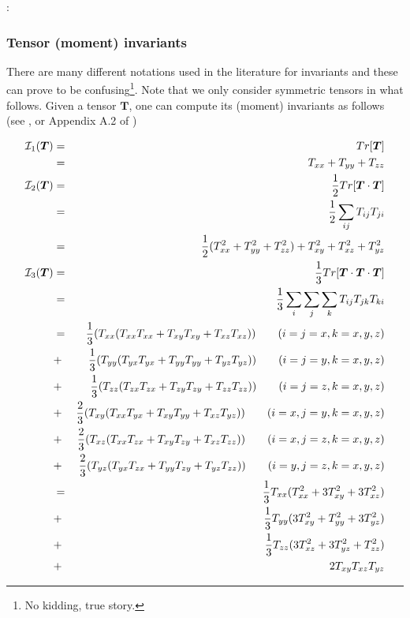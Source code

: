 
\Literature: \cite{mumc03,chpe15,momu06,muso11}

\subsubsection{Tensor (moment) invariants}\label{sec:invariants}


There are many different notations used in the literature for invariants 
and these can prove to be 
confusing\footnote{No kidding, true story.}. Note that we only consider symmetric tensors in what follows.
Given a tensor $\bm{T}$,  one can compute its (moment) invariants as follows 
(see \cite[p.339]{reddybook2}, or Appendix A.2 of \cite{zita2})

\begin{eqnarray}
{\cal I}_1({\bm T}) 
&=& Tr[\bm{T}] \\
&=& T_{xx} + T_{yy} + T_{zz} \\ 
{\cal I}_2({\bm T}) 
&=& \frac{1}{2} Tr[{\bm T}\cdot{\bm T}] \\
&=& \frac{1}{2} \sum_{ij} T_{ij} T_{ji} \\
&=& \frac{1}{2} (T_{xx}^2 + T_{yy}^2 + T_{zz}^2) + T_{xy}^2 + T_{xz}^2 + T_{yz}^2 \\ 
{\cal I}_3({\bm T}) 
&=& \frac{1}{3} Tr[{\bm T}\cdot{\bm T}\cdot {\bm T}]   \\
&=& \frac{1}{3}\sum_i\sum_j \sum_k T_{ij} T_{jk} T_{ki}  \\
&=& \frac{1}{3} (T_{xx} ( T_{xx}T_{xx} + T_{xy}T_{xy} + T_{xz}T_{xz} )) \qquad (i=j=x,k=x,y,z)\nonumber\\ 
&+& \frac{1}{3} (T_{yy} ( T_{yx}T_{yx} + T_{yy}T_{yy} + T_{yz}T_{yz} )) \qquad (i=j=y,k=x,y,z)\nonumber\\ 
&+& \frac{1}{3} (T_{zz} ( T_{zx}T_{zx} + T_{zy}T_{zy} + T_{zz}T_{zz} )) \qquad (i=j=z,k=x,y,z)\nonumber\\ 
&+& \frac{2}{3} (T_{xy} ( T_{xx}T_{yx} + T_{xy}T_{yy} + T_{xz}T_{yz} )) \qquad (i=x,j=y,k=x,y,z)\nonumber\\ 
&+& \frac{2}{3} (T_{xz} ( T_{xx}T_{zx} + T_{xy}T_{zy} + T_{xz}T_{zz} )) \qquad (i=x,j=z,k=x,y,z)\nonumber\\ 
&+& \frac{2}{3} (T_{yz} ( T_{yx}T_{zx} + T_{yy}T_{zy} + T_{yz}T_{zz} )) \qquad (i=y,j=z,k=x,y,z)\nonumber\\ 
&=& \frac{1}{3} T_{xx} (  T_{xx}^2 + 3 T_{xy}^2 + 3 T_{xz}^2  )     \nonumber\\
&+& \frac{1}{3} T_{yy} (3 T_{xy}^2 +   T_{yy}^2 + 3 T_{yz}^2  )     \nonumber\\
&+& \frac{1}{3} T_{zz} (3 T_{xz}^2 + 3 T_{yz}^2 +   T_{zz}^2)       \nonumber\\
&+& 2 T_{xy} T_{xz} T_{yz}  
\end{eqnarray}



